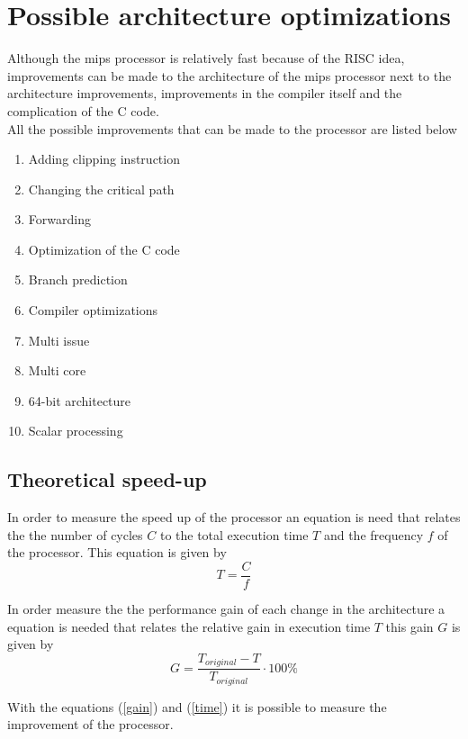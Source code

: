 \documentclass[10pt]{article}
\begin{document}
\section{Possible architecture  optimizations }

Although the mips processor is relatively fast because of the RISC idea, improvements can be made to the architecture of the mips processor next to  the architecture improvements, improvements in the compiler itself and the complication of the C code.\\
All the possible improvements that can be made to the processor are listed below
\begin{enumerate} \label{improvs}
  \item Adding clipping instruction
  \item Changing the critical path
  \item Forwarding
  \item Optimization of the C code
  \item Branch prediction
  \item Compiler optimizations
  \item Multi issue
  \item Multi core
  \item 64-bit architecture
  \item Scalar processing
\end{enumerate}


\subsection{Theoretical speed-up}

In order to measure the speed up of the processor an equation is need that relates the the number of cycles $C$ to the total execution time $T$ and the frequency $f$ of the processor. 
This equation is given by
\begin{equation}\label{time}
  T = \frac{C}{f}
\end{equation}

In order measure the the performance gain of each change in the architecture a equation is needed that relates the relative gain in execution time $T$ this gain $G$ is given by
\begin{equation}\label{gain}
  G = \frac{T_{original} - T}{T_{original}} \cdot 100 \%
\end{equation}

With the equations (\ref{gain}) and (\ref{time}) it is possible to measure the improvement of the processor.
\end{document}
